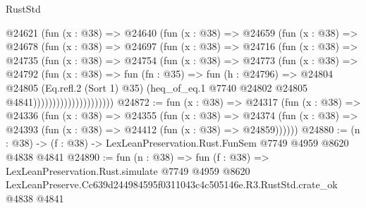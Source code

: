 \begin{lexlean}{RustStd}
\begin{coremodule}
                      @24621
                        (fun (x : @38) =>
                        @24640
                          (fun (x : @38) =>
                          @24659
                            (fun (x : @38) =>
                            @24678
                              (fun (x : @38) =>
                              @24697
                                (fun (x : @38) =>
                                @24716
                                  (fun (x : @38) =>
                                  @24735
                                    (fun (x : @38) =>
                                    @24754
                                      (fun (x : @38) =>
                                      @24773
                                        (fun (x : @38) =>
                                        @24792
                                          (fun (x : @38) =>
                                          fun (fn : @35) =>
                                          fun (h : @24796) =>
                                          @24804
                                            @24805
                                            (Eq.refl.{2} (Sort 1) @35)
                                            (heq_of_eq.{1}
                                              @7740
                                              @24802
                                              @24805
                                              @4841)))))))))))))))))))))
@24872 := fun (x : @38) =>
  @24317
    (fun (x : @38) =>
    @24336
      (fun (x : @38) =>
      @24355
        (fun (x : @38) =>
        @24374 (fun (x : @38) => @24393 (fun (x : @38) => @24412 (fun (x : @38) => @24859))))))
@24880 := (n : @38) -> (f : @38) -> LexLeanPreservation.Rust.FunSem @7749 @4959 @8620 @4838 @4841
@24890 := fun (n : @38) =>
  fun (f : @38) =>
  LexLeanPreservation.Rust.simulate
    @7749
    @4959
    @8620
    LexLeanPreserve.Cc639d244984595f0311043c4c505146e.R3.RustStd.crate_ok
    @4838
    @4841
\end{coremodule}
\end{lexlean}
